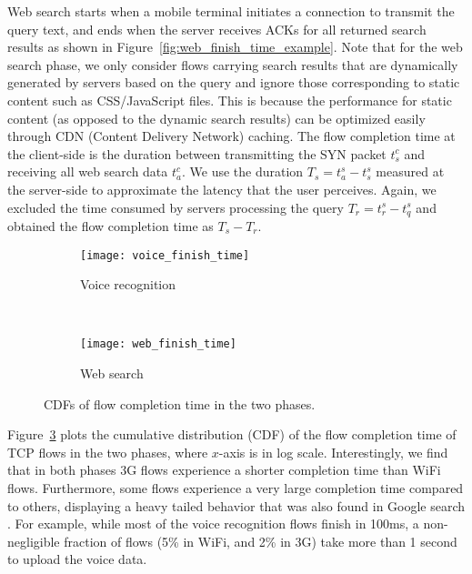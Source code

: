 Web search starts when a mobile terminal initiates a connection to transmit the query text, and ends when the server receives ACKs for all returned search results as shown in Figure~\ref{fig:web_finish_time_example}. Note that for the web search phase, we only consider flows carrying search results that are dynamically generated by servers based on the query and ignore those corresponding to static content such as CSS/JavaScript files. This is because the performance for static content (as opposed to the dynamic search results) can be optimized easily through CDN (Content Delivery Network) caching. The flow completion time at the client-side is the duration between transmitting the SYN packet $t^c_s$ and receiving all web search data $t^c_a$. We use the duration $T_s=t^s_a - t^s_s$ measured at the server-side to approximate the latency that the user perceives. Again, we excluded the time consumed by servers processing the query $T_r=t^s_r - t^s_q$ and obtained the flow completion time as $T_s-T_r$.

\begin{figure}[t]
\centering
\begin{subfigure}[b]{0.8\linewidth}
	\texttt{[image: voice\_finish\_time]}
\caption{Voice recognition}
\label{fig:voice_finish_time}
\end{subfigure} \\
\begin{subfigure}[b]{0.8\linewidth}
	\texttt{[image: web\_finish\_time]}
\caption{Web search}
\label{fig:web_finish_time}
\end{subfigure}
\caption{CDFs of flow completion time in the two phases.}
\label{fig:finish_time}
\end{figure}


Figure~\ref{fig:finish_time} plots the cumulative distribution (CDF) of the flow completion time of TCP flows in the two phases, where $x$-axis is in log scale. Interestingly, we find that in both phases 3G flows experience a shorter completion time than WiFi flows. Furthermore, some flows experience a very large completion time compared to others, displaying a heavy tailed behavior that was also found in Google search \cite{flach2013reducing}. For example, while most of the voice recognition flows finish in 100ms, a non-negligible fraction of flows (5\% in WiFi, and 2\% in 3G) take more than 1 second to upload the voice data. 


